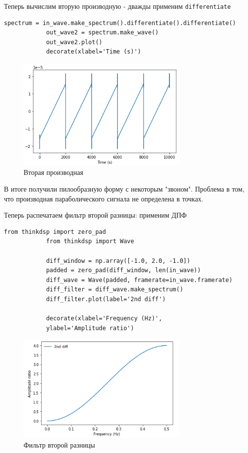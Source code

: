 \documentclass[a4paper,12pt]{article}
\begin{document}
\begin{enumerate}
		
		Теперь вычислим вторую производную - дважды применим \texttt{differentiate}
		\begin{lstlisting}[caption=Вычисляем вторую производную]
			spectrum = in_wave.make_spectrum().differentiate().differentiate()
			out_wave2 = spectrum.make_wave()
			out_wave2.plot()
			decorate(xlabel='Time (s)')
		\end{lstlisting}
		\begin{figure}[H]
			\centering
			\includegraphics[width=0.75\textwidth]{5_4.png}
			\caption{Вторая производная}
			\label{fig:5.4}
		\end{figure}
		
		В итоге получили пилообразную форму с некоторым "звоном". Проблема в том, что производная параболического сигнала не определена в точках.
		
		Теперь распечатаем фильтр второй разницы: применим ДПФ
		\begin{lstlisting}[caption=Фильтр второй разницы]
			from thinkdsp import zero_pad
			from thinkdsp import Wave
			
			diff_window = np.array([-1.0, 2.0, -1.0])
			padded = zero_pad(diff_window, len(in_wave))
			diff_wave = Wave(padded, framerate=in_wave.framerate)
			diff_filter = diff_wave.make_spectrum()
			diff_filter.plot(label='2nd diff')
			
			decorate(xlabel='Frequency (Hz)',
			ylabel='Amplitude ratio')
		\end{lstlisting}
		\begin{figure}[H]
			\centering
			\includegraphics[width=0.75\textwidth]{5_5.png}
			\caption{Фильтр второй разницы}
			\label{fig:5.5}
		\end{figure}
		

\end{enumerate}
\end{document}
